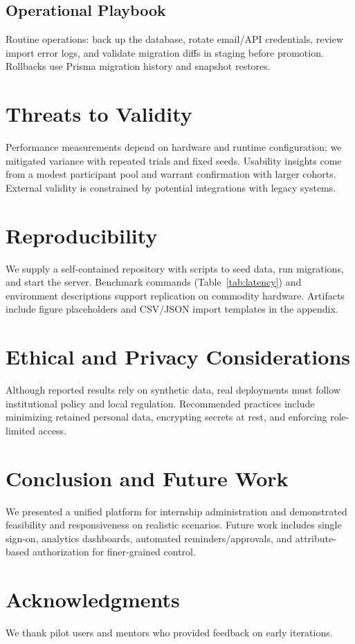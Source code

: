 \documentclass[conference]{IEEEtran}
\begin{document}
\subsection{Operational Playbook}
Routine operations: back up the database, rotate email/API credentials, review import error logs, and validate migration diffs in staging before promotion. Rollbacks use Prisma migration history and snapshot restores.

\section{Threats to Validity}
Performance measurements depend on hardware and runtime configuration; we mitigated variance with repeated trials and fixed seeds. Usability insights come from a modest participant pool and warrant confirmation with larger cohorts. External validity is constrained by potential integrations with legacy systems.

\section{Reproducibility}
We supply a self-contained repository with scripts to seed data, run migrations, and start the server. Benchmark commands (Table~\ref{tab:latency}) and environment descriptions support replication on commodity hardware. Artifacts include figure placeholders and CSV/JSON import templates in the appendix.

\section{Ethical and Privacy Considerations}
Although reported results rely on synthetic data, real deployments must follow institutional policy and local regulation. Recommended practices include minimizing retained personal data, encrypting secrets at rest, and enforcing role-limited access.

\section{Conclusion and Future Work}
We presented a unified platform for internship administration and demonstrated feasibility and responsiveness on realistic scenarios. Future work includes single sign-on, analytics dashboards, automated reminders/approvals, and attribute-based authorization for finer-grained control.

\section*{Acknowledgments}
We thank pilot users and mentors who provided feedback on early iterations.
\end{document}

